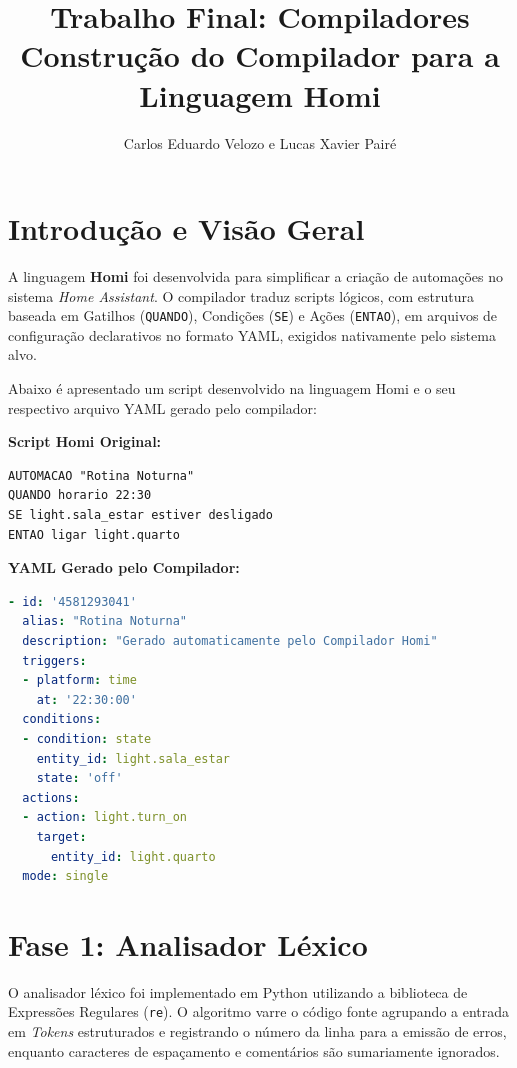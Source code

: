 \documentclass[12pt, a4paper]{article}
\title{\textbf{Trabalho Final: Compiladores}\\Construção do Compilador para a Linguagem Homi}
\author{Carlos Eduardo Velozo e Lucas Xavier Pairé}
\date{}
\begin{document}
\maketitle

\section{Introdução e Visão Geral}
A linguagem \textbf{Homi} foi desenvolvida para simplificar a criação de automações no sistema \textit{Home Assistant}. O compilador traduz scripts lógicos, com estrutura baseada em Gatilhos (\texttt{QUANDO}), Condições (\texttt{SE}) e Ações (\texttt{ENTAO}), em arquivos de configuração declarativos no formato YAML, exigidos nativamente pelo sistema alvo.

Abaixo é apresentado um script desenvolvido na linguagem Homi e o seu respectivo arquivo YAML gerado pelo compilador:

\textbf{Script Homi Original:}
\begin{lstlisting}
AUTOMACAO "Rotina Noturna"
QUANDO horario 22:30
SE light.sala_estar estiver desligado
ENTAO ligar light.quarto
\end{lstlisting}

\textbf{YAML Gerado pelo Compilador:}
\begin{lstlisting}[language=YAML]
- id: '4581293041'
  alias: "Rotina Noturna"
  description: "Gerado automaticamente pelo Compilador Homi"
  triggers:
  - platform: time
    at: '22:30:00'
  conditions:
  - condition: state
    entity_id: light.sala_estar
    state: 'off'
  actions:
  - action: light.turn_on
    target:
      entity_id: light.quarto
  mode: single
\end{lstlisting}

\section{Fase 1: Analisador Léxico}
O analisador léxico foi implementado em Python utilizando a biblioteca de Expressões Regulares (\texttt{re}). O algoritmo varre o código fonte agrupando a entrada em \textit{Tokens} estruturados e registrando o número da linha para a emissão de erros, enquanto caracteres de espaçamento e comentários são sumariamente ignorados.
\end{document}
